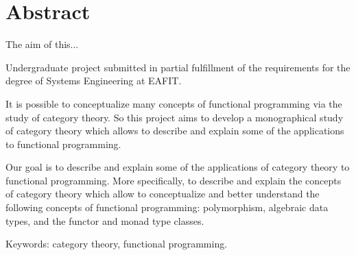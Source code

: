 \chapter{Abstract}

The aim of this... %

Undergraduate project submitted in partial fulfillment of the
requirements for the degree of Systems Engineering at EAFIT.

It is possible to conceptualize many concepts of functional
programming via the study of category theory. So this project aims to
develop a monographical study of category theory which allows to
describe and explain some of the applications to functional
programming.

Our goal is to describe and explain some of the applications of
category theory to functional programming. More specifically, to
describe and explain the concepts of category theory which allow to
conceptualize and better understand the following concepts of
functional programming: polymorphism, algebraic data types, and the
functor and monad type classes.

\vspace{1em}
\noindent
Keywords: category theory, functional programming.

\clearemptydoublepage
